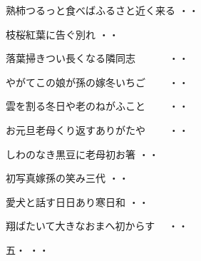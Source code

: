 \vspace{0.6cm}
\begin{shiika}熟柿つるっと食べばふるさと近く来る
\hfill{・・}\end{shiika}
\vspace{0.6cm}
\begin{shiika}枝桜紅葉に告ぐ別れ
\hfill{・・}\end{shiika}
\vspace{0.6cm}
\begin{shiika}落葉掃きつい長くなる隣同志　　　
\hfill{・・}\end{shiika}
\vspace{0.6cm}
\begin{shiika}やがてこの娘が孫の嫁冬いちご　　
\hfill{・・}\end{shiika}
\vspace{0.6cm}
\begin{shiika}雲を割る冬日や老のねがふこと　　
\hfill{・・}\end{shiika}
\vspace{0.6cm}
\begin{shiika}お元旦老母くり返すありがたや　　
\hfill{・・}\end{shiika}
\vspace{0.6cm}
\begin{shiika}しわのなき黒豆に老母初お箸
\hfill{・・}\end{shiika}
\vspace{0.6cm}
\begin{shiika}初写真嫁孫の笑み三代
\hfill{・・}\end{shiika}
\vspace{0.6cm}
\begin{shiika}愛犬と話す日日あり寒日和
\hfill{・・}\end{shiika}
\vspace{0.6cm}
\begin{shiika}翔ばたいて大きなおまへ初からす　
\hfill{・・}\end{shiika}
\vspace{0.6cm}
\begin{shiika}五・
\hfill{・・}\end{shiika}
